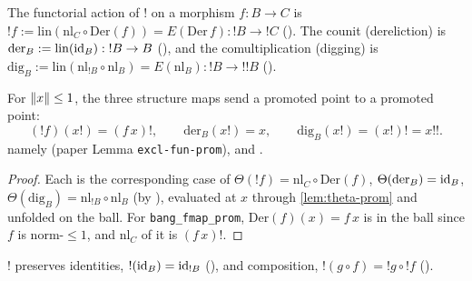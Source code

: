 \begin{definition}\label{def:struct-maps}
\rocqok
{}\rocqok
{}\rocqok
{}
The functorial action of $\mathord{!}$ on a morphism $f : B \to C$ is
$\mathord{!}f := \mathrm{lin}(\mathrm{nl}_C \circ \mathrm{Der}(f)) =
E(\mathrm{Der}\,f) : \mathord{!}B \to \mathord{!}C$
(). The counit (dereliction) is
$\mathrm{der}_B := \mathrm{lin}(\mathrm{id}_B) : \mathord{!}B \to B$
(), and the comultiplication (digging) is
$\mathrm{dig}_B := \mathrm{lin}(\mathrm{nl}_{\mathord{!}B} \circ
\mathrm{nl}_B) = E(\mathrm{nl}_B) : \mathord{!}B \to \mathord{!}\mathord{!}B$
().
\end{definition}

\begin{lemma}\label{lem:struct-prom}
\rocqok
{}\rocqok
{}\rocqok
{}
For $\lVert x \rVert \leq 1$, the three structure maps send a promoted point
to a promoted point:
\[
  (\mathord{!}f)(x!) = (f\,x)!,
  \qquad
  \mathrm{der}_B(x!) = x,
  \qquad
  \mathrm{dig}_B(x!) = (x!)! = x!!.
\]
namely  (paper Lemma
\texttt{excl-fun-prom}),  and
.
\end{lemma}

\begin{proof}
Each is the corresponding case of $\Theta(\mathord{!}f) = \mathrm{nl}_C
\circ \mathrm{Der}(f)$, $\Theta(\mathrm{der}_B) = \mathrm{id}_B$,
$\Theta(\mathrm{dig}_B) = \mathrm{nl}_{\mathord{!}B} \circ \mathrm{nl}_B$
(by ), evaluated at $x$ through
\autoref{lem:theta-prom} and unfolded on the ball. For
\texttt{bang\_fmap\_prom}, $\mathrm{Der}(f)(x) = f\,x$ is in the ball
since $f$ is norm-$\leq 1$, and $\mathrm{nl}_C$ of it is $(f\,x)!$.
\end{proof}

\begin{lemma}\label{lem:bang-functor}
\rocqok
{}\rocqok
{}
$\mathord{!}$ preserves identities, $\mathord{!}(\mathrm{id}_B) =
\mathrm{id}_{\mathord{!}B}$ (), and
composition, $\mathord{!}(g \circ f) = \mathord{!}g \circ \mathord{!}f$
().
\end{lemma}

